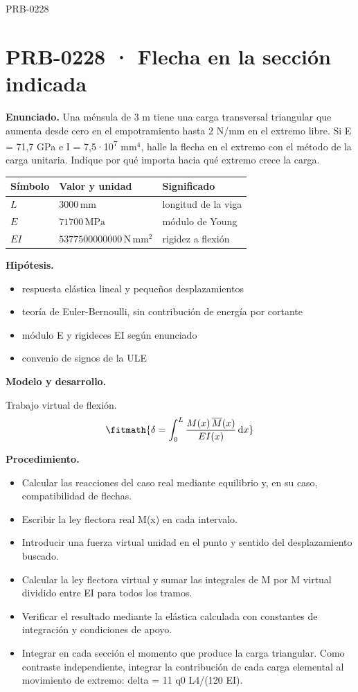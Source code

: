 \begin{studiumworked}{PRB-0228}

\section{PRB-0228 · Flecha en la sección indicada}

\textbf{Enunciado.} Una ménsula de 3 m tiene una carga transversal triangular que aumenta desde cero en el empotramiento hasta 2 N/mm en el extremo libre. Si E = 71,7 GPa e I = 7,5·10\textsuperscript{7} mm$^4$, halle la flecha en el extremo con el método de la carga unitaria. Indique por qué importa hacia qué extremo crece la carga.

\par\medskip\noindent\begin{tabular}{@{}p{.18\linewidth}p{.26\linewidth}p{.48\linewidth}@{}}
\toprule Símbolo & Valor y unidad & Significado\\\midrule
$L$ & $3000\,\mathrm{mm}$ & longitud de la viga\\
$E$ & $71700\,\mathrm{MPa}$ & módulo de Young\\
$EI$ & $5377500000000\,\mathrm{N\,mm^2}$ & rigidez a flexión\\
\bottomrule\end{tabular}\par\medskip

\textbf{Hipótesis.}\begin{itemize}\item respuesta elástica lineal y pequeños desplazamientos
\item teoría de Euler-Bernoulli, sin contribución de energía por cortante
\item módulo E y rigideces EI según enunciado
\item convenio de signos de la ULE\end{itemize}

\textbf{Modelo y desarrollo.}

Trabajo virtual de flexión.\[\fitmath{\delta = \int_{0}^{L}\frac{M(x)\,\overline{M}(x)}{E I(x)}\,\mathrm{d}x}\]

\textbf{Procedimiento.}\begin{itemize}\item Calcular las reacciones del caso real mediante equilibrio y, en su caso, compatibilidad de flechas.
\item Escribir la ley flectora real M(x) en cada intervalo.
\item Introducir una fuerza virtual unidad en el punto y sentido del desplazamiento buscado.
\item Calcular la ley flectora virtual y sumar las integrales de M por M virtual dividido entre EI para todos los tramos.
\item Verificar el resultado mediante la elástica calculada con constantes de integración y condiciones de apoyo.
\item Integrar en cada sección el momento que produce la carga triangular. Como contraste independiente, integrar la contribución de cada carga elemental al movimiento de extremo: delta = 11 q0 L4/(120 EI).\end{itemize}


\end{studiumworked}
